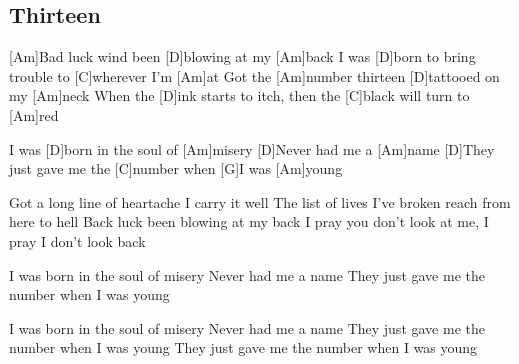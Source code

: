\subsection*{Thirteen   }



\begin{guitar}


[Am]Bad luck wind been [D]blowing at my [Am]back
I was [D]born to bring trouble to [C]wherever I'm [Am]at 
Got the [Am]number thirteen [D]tattooed on my [Am]neck
When the [D]ink starts to itch, then the [C]black will turn to [Am]red


I was [D]born in the soul of [Am]misery
[D]Never had me a [Am]name
[D]They just gave me the [C]number when [G]I was [Am]young


Got a long line of heartache
I carry it well
The list of lives
I've broken reach from here to hell
Back luck been blowing at my back
I pray you don't look at me, I pray I don't look back

I was born in the soul of misery
Never had me a name
They just gave me the number when I was young

I was born in the soul of misery
Never had me a name
They just gave me the number when I was young
They just gave me the number when I was young

\end{guitar}
